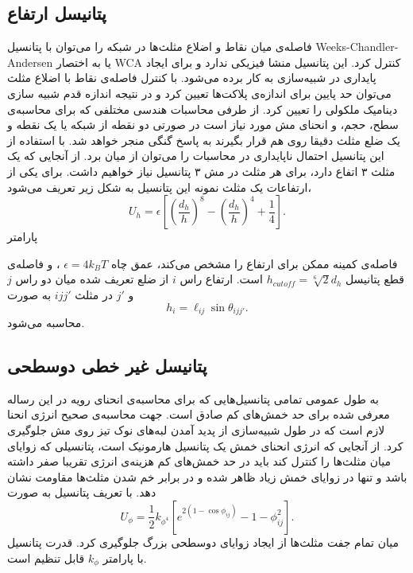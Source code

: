 \subsection{
پتانیسل ارتفاع
}

فاصله‌ی میان نقاط و اضلاع مثلث‌ها در شبکه را می‌توان با پتانسیل 
Weeks-Chandler-Andersen
یا به اختصار
WCA
کنترل کرد. این پتانسیل منشا فیزیکی ندارد و برای ایجاد پایداری در شبیه‌سازی به کار برده می‌شود. با کنترل فاصله‌ی نقاط با اضلاع مثلث‌ می‌توان حد پایین برای اندازه‌ی پلاکت‌ها تعیین کرد و در نتیجه اندازه قدم شبیه‌ سازی دینامیک ملکولی را تعیین کرد. از طرفی محاسبات هندسی مختلفی که برای محاسبه‌ی سطح، حجم، و انحنای مش مورد نیاز است در صورتی دو نقطه از شبکه یا یک نقطه و یک ضلع مثلث دقیقا روی هم قرار بگیرند به پاسخ گنگی منجر خواهد شد. با استفاده از این پتانسیل احتمال ناپایداری در محاسبات را می‌توان از میان برد. از آنجایی که یک مثلث ۳ اتفاع دارد، برای هر مثلث در مش ۳ پتانسیل نیاز خواهیم داشت. برای یکی از ارتفاعات یک مثلث نمونه این پتانسیل به شکل زیر تعریف می‌شود،
\begin{equation}
U_{h}=\epsilon\left[\left(\frac{d_h}{h}\right)^8-\left(\frac{d_h}{h}\right)^4+\frac{1}{4}\right].
\label{eq:wcah}
\end{equation} 
پارامتر

فاصله‌ی کمینه ممکن برای ارتفاع را مشخص می‌کند،  عمق چاه
$\epsilon=4k_BT$
، و فاصله‌ی قطع 
پتانیسل 
$h_{cutoff}=\sqrt[6]{2}d_h$
است. ارتفاع راس
$i$
از ضلع تعریف شده میان دو راس
$j$
و
$j'$
در مثلث
$ijj'$
به صورت 
\begin{equation}
h_i=\ell_{ij}\sin\theta_{ijj'}.
\end{equation} 
محاسبه می‌شود.

\subsection{
پتانیسل غیر خطی دوسطحی
}
به طول عمومی تمامی پتانسیل‌هایی که برای محاسبه‌ی انحنای رویه در این رساله معرفی شده برای حد خمش‌های کم صادق است. جهت محاسبه‌ی صحیح انرژی انحنا لازم است که در طول شبیه‌سازی از پدید آمدن لبه‌های نوک تیز روی مش جلوگیری کرد. از آنجایی که انرژی انحنای خمش یک پتانسیل هارمونیک است، پتانسیلی که زوایای میان مثلث‌ها را کنترل کند باید در حد خمش‌های کم هزینه‌ی انرژی تقریبا صفر داشته باشد و تنها در زوایای خمش زیاد ظاهر شده و در برابر خم شدن مثلث‌ها مقاومت نشان دهد. با تعریف پتانسیل به صورت
\begin{equation}
U_{\phi}=\frac{1}{2}k_{\phi^4}\left[e^{2(1-\cos\phi_{ij})}-1-\phi_{ij}^2 \right].
\label{eq:theta4}
\end{equation}
میان تمام جفت مثلث‌ها از ایجاد زوایای دوسطحی بزرگ جلوگیری کرد. قدرت پتانسیل با پارامتر 
$k_{\phi}$
قابل تنظیم است.










